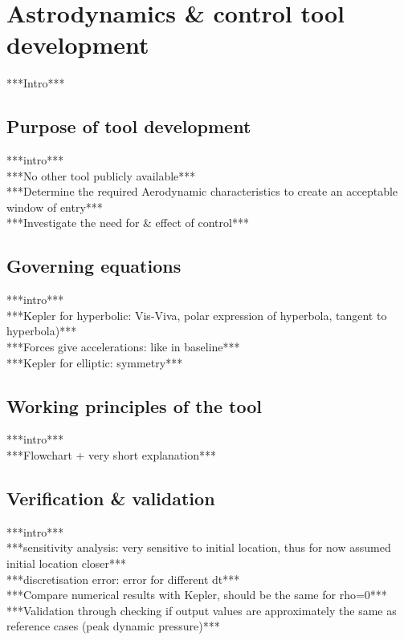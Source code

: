 \section{Astrodynamics \& control tool development}
\label{ch:astrocontrol}
***Intro***\\

\subsection{Purpose of tool development}
\label{sec:astropurpose}
***intro***\\
***No other tool publicly available***\\
***Determine the required Aerodynamic characteristics to create an acceptable window of entry***\\
***Investigate the need for \& effect of control***\\

\subsection{Governing equations}
***intro***\\
***Kepler for hyperbolic: Vis-Viva, polar expression of hyperbola, tangent to hyperbola)***\\
***Forces give accelerations: like in baseline***\\
***Kepler for elliptic: symmetry***\\

\subsection{Working principles of the tool}
***intro***\\
***Flowchart + very short explanation***\\

\subsection{Verification \& validation}
***intro***\\
***sensitivity analysis: very sensitive to initial location, thus for now assumed initial location closer***\\
***discretisation error: error for different dt***\\
***Compare numerical results with Kepler, should be the same for rho=0***\\
***Validation through checking if output values are approximately the same as reference cases (peak dynamic pressure)***\\


